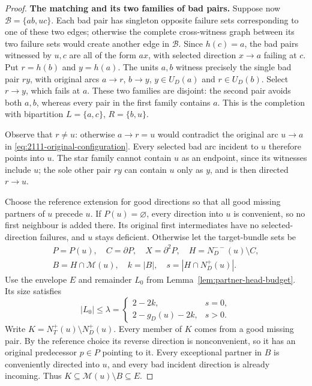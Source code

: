 \begin{proof}
\par\medskip\noindent\textbf{The matching and its two families of bad pairs.}\quad 
Suppose now $\mathcal B=\{ab,uc\}$. Each bad pair has singleton
opposite failure sets corresponding to one of these two edges;
otherwise the complete cross-witness graph between its two failure
sets would create another edge in $\mathcal B$.
Since $h(c)=a$, the bad pairs witnessed by $u,c$ are all of the form
$ax$, with selected direction $x\to a$ failing at $c$.
Put $r=h(b)$ and $y=h(a)$. The units $a,b$ witness precisely the
single bad pair $ry$, with original arcs $a\to r$, $b\to y$,
$y\in U_D(a)$ and $r\in U_D(b)$. Select $r\to y$, which fails at $a$.
These two families are disjoint: the second pair avoids both $a,b$,
whereas every pair in the first family contains $a$.
This is the completion with bipartition
$L=\{a,c\}$, $R=\{b,u\}$.

Observe that $r\ne u$: otherwise $a\to r=u$ would contradict the
original arc $u\to a$ in
\eqref{eq:2111-original-configuration}.
Every selected bad arc incident to $u$ therefore points into $u$.
The star family cannot contain $u$ as an endpoint, since its witnesses
include $u$; the sole other pair $ry$ can contain $u$ only as $y$,
and is then directed $r\to u$.

Choose the reference extension for good directions so that all good
missing partners of $u$ precede $u$.
If $P(u)=\varnothing$, every direction into $u$ is convenient,
so no first neighbour is added there. Its original first intermediates
have no selected-direction failures, and $u$ stays deficient.
Otherwise let the target-bundle sets be
\[
 \begin{gathered}
 P=P(u),\quad C=\partial P,\quad X=\partial^2P,\quad H=N_D^{--}(u)\setminus C,\\
 B=H\cap\mathcal M(u),\quad k=|B|,\quad s=|H\cap N_D^+(u)|.
 \end{gathered}
\]
Use the envelope $E$ and remainder $L_0$ from
Lemma~\ref{lem:partner-head-budget}. Its size satisfies
\[
 |L_0|\le\lambda=
 \begin{cases}2-2k,&s=0,\\2-g_D(u)-2k,&s>0.\end{cases}
\]
Write $K=N_T^+(u)\setminus N_D^+(u)$.
Every member of $K$ comes from a good missing pair. By the reference
choice its reverse direction is nonconvenient, so it has an original
predecessor $p\in P$ pointing to it.
Every exceptional partner in $B$ is conveniently directed into $u$,
and every bad incident direction is already incoming. Thus
$K\subseteq\mathcal M(u)\setminus B\subseteq E$.


\end{proof}
